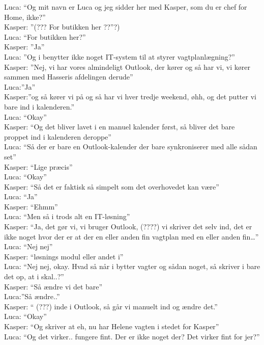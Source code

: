 Luca: “Og mit navn er Luca og jeg sidder her med Kasper, som du er chef for Home, ikke?”\\
Kasper: ”(??? For butikken her ??”?)\\
Luca: “For butikken her?”\\
Kasper: ”Ja”\\
Luca: ”Og i benytter ikke noget IT-system til at styrer vagtplanlægning?”\\
Kasper: ”Nej, vi har vores almindeligt Outlook, der kører og så har vi, vi kører sammen med Hasseris afdelingen derude”\\
Luca:”Ja”\\
Kasper:”og så kører vi på og så har vi hver tredje weekend, øhh, og det putter vi bare ind i kalenderen.”\\
Luca: “Okay”\\
Kasper: “Og det bliver lavet i en manuel kalender først, så bliver det bare proppet ind i kalenderen deroppe”\\
Luca: “Så der er bare en Outlook-kalender der bare synkroniserer med alle sådan set”\\
Kasper: “Lige præcis”\\
Luca: “Okay”\\
Kasper: “Så det er faktisk så simpelt som det overhovedet kan være”\\
Luca: “Ja”\\
Kasper: “Ehmm”\\
Luca: “Men så i trods alt en IT-løsning”\\
Kasper: “Ja, det gør vi, vi bruger Outlook, (????) vi skriver det selv ind, det er ikke noget hvor der er at der en eller anden fin vagtplan med en eller anden fin…”\\
Luca: “Nej nej”\\
Kasper: “løsnings modul eller andet i”\\
Luca: “Nej nej, okay. Hvad så når i bytter vagter og sådan noget, så skriver i bare det op, at i skal..?”\\
Kasper: “Så ændre vi det bare”\\
Luca:”Så ændre..”\\
Kasper: “ (???) inde i Outlook, så går vi manuelt ind og ændre det.”\\
Luca: “Okay”\\
Kasper: “Og skriver at eh, nu har Helene vagten i stedet for Kasper”\\
Luca: “Og det virker.. fungere fint. Der er ikke noget der? Det virker fint for jer?”\\
